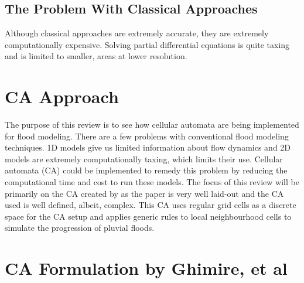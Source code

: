 \subsection{The Problem With Classical Approaches}
Although classical approaches are extremely accurate, they are extremely computationally expensive. Solving partial differential equations is quite taxing and is limited to smaller, areas at lower resolution. 

\section{CA Approach}
The purpose of this review is to see how cellular automata are being implemented for flood modeling. There are a few problems with conventional flood modeling techniques. 1D models give us limited information about flow dynamics and 2D models are extremely computationally taxing, which limits their use. Cellular automata (CA) could be implemented to remedy this problem by reducing the computational time and cost to run these models. The focus of this review will be primarily on the CA created by \cite{Ghimire} as the paper is very well laid-out and the CA used is well defined, albeit, complex. This CA uses regular grid cells as a discrete space for the CA setup and applies generic rules to local neighbourhood cells to simulate the progression of pluvial floods.


\section*{CA Formulation by Ghimire, et al}

